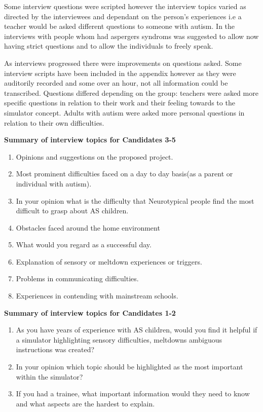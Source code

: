 \documentclass[11pt]{report}
\begin{document}
Some interview questions were scripted however the interview topics varied as directed by the interviewees and dependant on the person's experiences i.e a teacher would be asked different questions to someone with autism. In \cite{aspieway} the interviews with people whom had aspergers syndroms was suggested to allow now having strict questions and to allow the individuals to freely speak. 

As interviews progressed there were improvements on questions asked. Some interview scripts have been included in the appendix however as they were auditorily recorded and some over an hour, not all information could be transcribed. Questions differed depending on the group: teachers were asked more specific questions in relation to their work and their feeling towards to the simulator concept. Adults with autism were asked more personal questions in relation to their own difficulties. 

\textbf{Summary of interview topics for Candidates 3-5}
\begin{enumerate}
\item Opinions and suggestions on the proposed project.
\item Most prominent difficulties faced on a day to day basis(as a parent or individual with autism).
\item In your opinion what is the difficulty that Neurotypical people find the most difficult to grasp about AS children.
\item Obstacles faced around the home environment
\item What would you regard as a successful day.
\item Explanation of sensory or meltdown experiences or triggers.
\item Problems in communicating difficulties.
\item Experiences in contending with mainstream schools.
\end{enumerate}

\textbf{Summary of interview topics for Candidates 1-2}
\begin{enumerate}
\item As you have years of experience with AS children, would you find it helpful if a simulator highlighting sensory difficulties, meltdowns ambiguous instructions was created?
\item In your opinion which topic should be highlighted as the most important within the simulator? 
\item If you had a trainee, what important information would they need to know and what aspects are the hardest to explain.
\end{enumerate}
\end{document}
